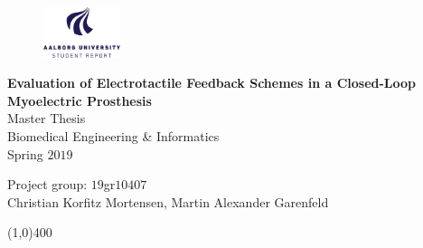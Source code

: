 \clearpage
\thispagestyle{empty}

\begin{figure}[H]
	\raggedleft
	\includegraphics[width=0.2\textwidth]{figures/aaulogo-en.png}
\end{figure} 

\vspace{5 cm}

\begin{center}
	\begin{Huge}
		\textbf{Evaluation of Electrotactile Feedback Schemes in a
			Closed-Loop Myoelectric Prosthesis}\\
		\vspace{5 mm}
		Master Thesis \\
		Biomedical Engineering \& Informatics \\ Spring $2019$\\
		\vspace{3 mm}
	\end{Huge}
	{\Large Project group: $19$gr$10407$} \\
	\vspace{1cm}
	\large{Christian Korfitz Mortensen, Martin Alexander Garenfeld}
\end{center}
\vspace*{\fill}

\begin{center}
	\line(1,0){400}
\end{center}

%
%
%
%
%	
%	
%	
%
%
%
\newpage
